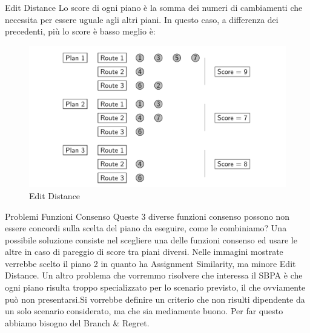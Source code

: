 \documentclass[10pt]{beamer}
\begin{document}
    \begin{frame}{Edit Distance}
        Lo score di ogni piano è la somma dei numeri di cambiamenti che necessita per essere uguale agli altri piani. In questo caso, a differenza dei precedenti, più lo score è basso meglio è:
        \begin{figure}[h!]
            \centering
            \includegraphics[scale=0.25]{Images/EditDistance.png}
            \caption{Edit Distance}
            \label{fig:EditDistance}
        \end{figure}
    \end{frame}

    \begin{frame}{Problemi Funzioni Consenso}
        Queste 3 diverse funzioni consenso possono non essere concordi sulla scelta del piano da eseguire, come le combiniamo?\newline
        Una possibile soluzione consiste nel scegliere una delle funzioni consenso ed usare le altre in caso di pareggio di score tra piani diversi. Nelle immagini mostrate verrebbe scelto il piano 2 in quanto ha Assignment Similarity, ma minore Edit Distance.
        \newline
        \newline
        Un altro problema che vorremmo risolvere che interessa il SBPA è che ogni piano risulta troppo specializzato per lo scenario previsto, il che ovviamente può non presentarsi.Si vorrebbe definire un criterio che non risulti dipendente da un solo scenario considerato, ma che sia mediamente buono. Per far questo abbiamo bisogno del Branch \& Regret.
    \end{frame}
\end{document}
